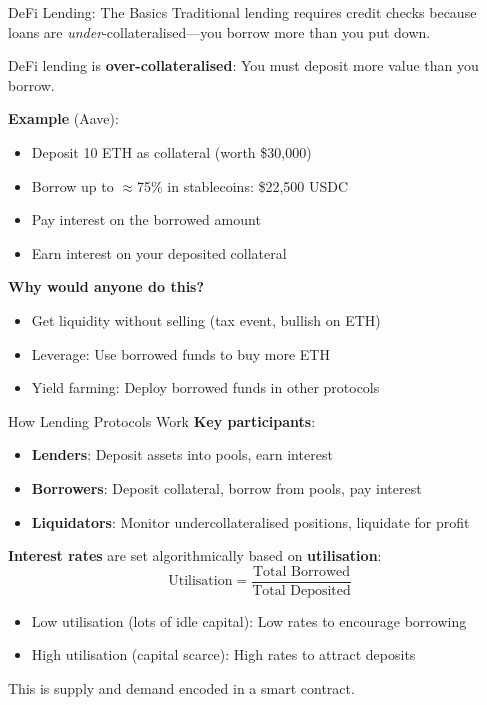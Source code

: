 \documentclass[10pt]{beamer}
\newcommand{\highlight}[1]{\textcolor{AccentOrange}{\textbf{#1}}}
\begin{document}
\begin{frame}{DeFi Lending: The Basics}
  Traditional lending requires credit checks because loans are \textit{under}-collateralised---you borrow more than you put down.
  
  \vspace{1em}
  DeFi lending is \highlight{over-collateralised}: You must deposit more value than you borrow.
  
  \vspace{1em}
  \textbf{Example} (Aave):
  \begin{itemize}
    \item Deposit 10 ETH as collateral (worth \$30,000)
    \item Borrow up to $\approx$75\% in stablecoins: \$22,500 USDC
    \item Pay interest on the borrowed amount
    \item Earn interest on your deposited collateral
  \end{itemize}
  
  \vspace{1em}
  \textbf{Why would anyone do this?}
  \begin{itemize}
    \item Get liquidity without selling (tax event, bullish on ETH)
    \item Leverage: Use borrowed funds to buy more ETH
    \item Yield farming: Deploy borrowed funds in other protocols
  \end{itemize}
\end{frame}

\begin{frame}{How Lending Protocols Work}
  \textbf{Key participants}:
  \begin{itemize}
    \item \textbf{Lenders}: Deposit assets into pools, earn interest
    \item \textbf{Borrowers}: Deposit collateral, borrow from pools, pay interest
    \item \textbf{Liquidators}: Monitor undercollateralised positions, liquidate for profit
  \end{itemize}
  
  \vspace{1em}
  \textbf{Interest rates} are set algorithmically based on \highlight{utilisation}:
  \[
  \text{Utilisation} = \frac{\text{Total Borrowed}}{\text{Total Deposited}}
  \]
  
  \begin{itemize}
    \item Low utilisation (lots of idle capital): Low rates to encourage borrowing
    \item High utilisation (capital scarce): High rates to attract deposits
  \end{itemize}
  
  \vspace{0.5em}
  This is supply and demand encoded in a smart contract.
\end{frame}
\end{document}
